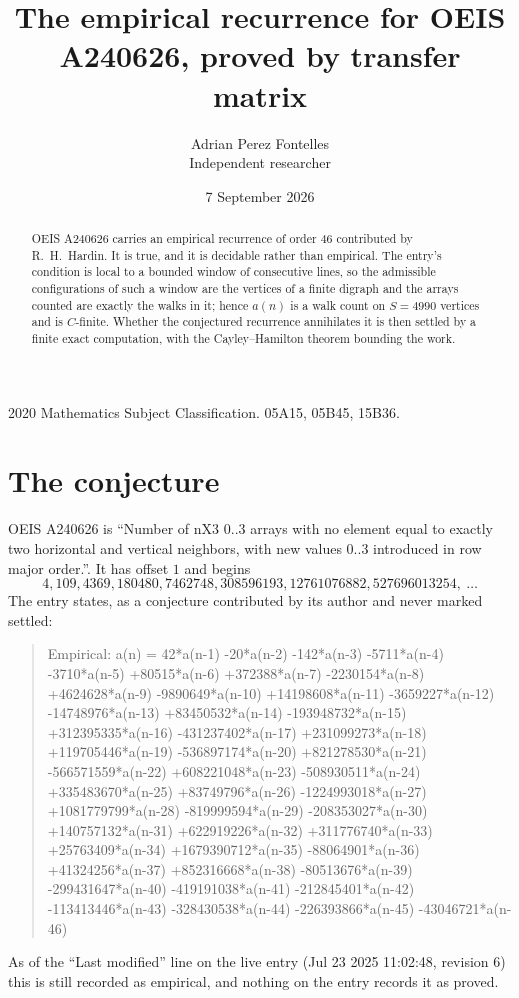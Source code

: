 \documentclass[11pt,a4paper]{article}
\title{The empirical recurrence for OEIS A240626, proved by transfer matrix}
\author{Adrian Perez Fontelles\\ \small Independent researcher}
\date{7 September 2026}
\theoremstyle{plain}
\theoremstyle{definition}
\begin{document}
\maketitle

\begin{abstract}
OEIS A240626 carries an empirical recurrence of order $46$ contributed by R.~H.~Hardin. It is
true, and it is decidable rather than empirical. The entry's condition is local to a bounded window of consecutive lines, so
the admissible configurations of such a window are the vertices of a finite digraph and the
arrays counted are exactly the walks in it; hence $a(n)$ is a walk count on $S=4990$ vertices
and is $C$-finite. Whether the conjectured recurrence annihilates it is then settled by a
finite exact computation, with the Cayley--Hamilton theorem bounding the work.
\end{abstract}

\noindent\small 2020 Mathematics Subject Classification. 05A15, 05B45, 15B36.\normalsize

\section{The conjecture}

OEIS A240626 is ``Number of nX3 0..3 arrays with no element equal to exactly two horizontal and vertical neighbors, with new values 0..3 introduced in row major order.''. It has offset $1$ and begins
\[
4, 109, 4369, 180480, 7462748, 308596193, 12761076882, 527696013254,\ \dots
\]
The entry states, as a conjecture contributed by its author and never marked settled:
\begin{quote}
Empirical: a(n) = 42*a(n-1) -20*a(n-2) -142*a(n-3) -5711*a(n-4) -3710*a(n-5) +80515*a(n-6) +372388*a(n-7) -2230154*a(n-8) +4624628*a(n-9) -9890649*a(n-10) +14198608*a(n-11) -3659227*a(n-12) -14748976*a(n-13) +83450532*a(n-14) -193948732*a(n-15) +312395335*a(n-16) -431237402*a(n-17) +231099273*a(n-18) +119705446*a(n-19) -536897174*a(n-20) +821278530*a(n-21) -566571559*a(n-22) +608221048*a(n-23) -508930511*a(n-24) +335483670*a(n-25) +83749796*a(n-26) -1224993018*a(n-27) +1081779799*a(n-28) -819999594*a(n-29) -208353027*a(n-30) +140757132*a(n-31) +622919226*a(n-32) +311776740*a(n-33) +25763409*a(n-34) +1679390712*a(n-35) -88064901*a(n-36) +41324256*a(n-37) +852316668*a(n-38) -80513676*a(n-39) -299431647*a(n-40) -419191038*a(n-41) -212845401*a(n-42) -113413446*a(n-43) -328430538*a(n-44) -226393866*a(n-45) -43046721*a(n-46)
\end{quote}
As of the ``Last modified'' line on the live entry (Jul 23 2025 11:02:48, revision 6) this is still
recorded as empirical, and nothing on the entry records it as proved.
\end{document}
